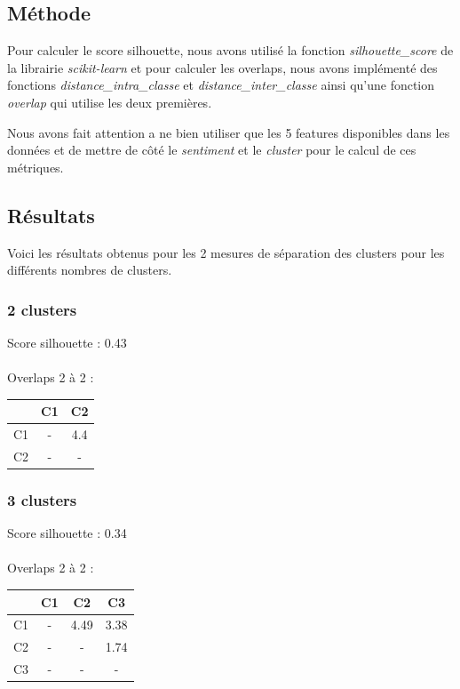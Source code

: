 \documentclass{article}
\begin{document}
\subsection*{Méthode}

Pour calculer le score silhouette, nous avons utilisé la fonction 
\textit{silhouette\_score} de la librairie \textit{scikit-learn} et 
pour calculer les overlaps, nous avons implémenté des fonctions
\textit{distance\_intra\_classe} et \textit{distance\_inter\_classe}
ainsi qu'une fonction \textit{overlap} qui utilise les deux premières.

Nous avons fait attention a ne bien utiliser que les 5 features disponibles
dans les données et de mettre de côté le \textit{sentiment} et le \textit{cluster}
pour le calcul de ces métriques.

\subsection*{Résultats}

Voici les résultats obtenus pour les 2 mesures de séparation des clusters
pour les différents nombres de clusters.

\subsubsection*{2 clusters}

\noindent Score silhouette : 0.43 \\\\
Overlaps 2 à 2 :\\

\begin{center}
\begin{tabular}{|c|c|c|}
\hline
& C1 & C2 \\
\hline
C1 & - & 4.4 \\
\hline
C2 & - & - \\  
\hline
\end{tabular}
\end{center}

\subsubsection*{3 clusters}

\noindent Score silhouette : 0.34 \\\\
Overlaps 2 à 2 :\\

\begin{center}
\begin{tabular}{|c|c|c|c|}
\hline
& C1 & C2 & C3 \\
\hline
C1 & - & 4.49 & 3.38 \\
\hline
C2 & - & - & 1.74 \\
\hline
C3 & - & - & - \\   
\hline
\end{tabular} 
\end{center} 
\end{document}
